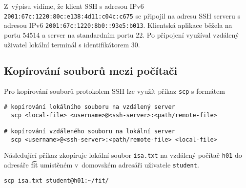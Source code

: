 Z~výpisu vidíme, že klient SSH s adresou IPv6 {\tt 2001:67c:1220:80c:e138:4d11:c04c:c675} se připojil na adresu SSH serveru s adresou IPv6 {\tt 2001:67c:1220:8b0::93e5:b013}. Klientská aplikace běžela na portu 54514 a server na standardním portu 22. Po připojení využíval vzdálený uživatel lokální terminál s identifikátorem 30. 

\subsection{Kopírování souborů mezi počítači}
Pro kopírování souborů protokolem SSH lze využít příkaz {\tt scp} s formátem
\begin{verbatim}
# kopírování lokálního souboru na vzdálený server
  scp <local-file> <username>@<ssh-server>:<path/remote-file>

# kopírování vzdáleného souboru na lokální server 
  scp <username>@<ssh-server>:<path/remote-file> <local-file>
\end{verbatim}
Následující příkaz zkopíruje lokální soubor {\tt isa.txt} na vzdálený počítač {\tt h01} do adresáře {\t fit} umístěném v~domovském adresáři uživatele {\tt student}.
\begin{verbatim}
scp isa.txt student@h01:~/fit/
\end{verbatim}

